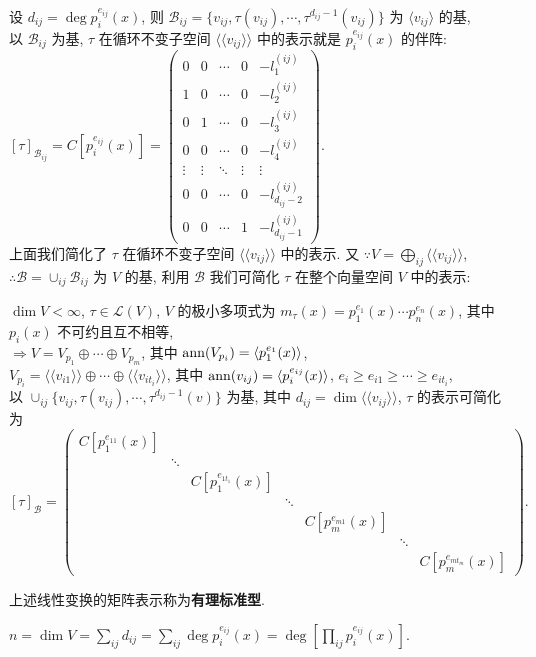 \documentclass{note}
\begin{document}
设 $d_{ij}=\deg p_i^{e_{ij}}(x)$, 则 $\mathcal{B}_{ij}=\{v_{ij},\tau(v_{ij}),\cdots,\tau^{d_{ij}-1}(v_{ij})\}$ 为 $\langle v_{ij}\rangle$ 的基,\\
以 $\mathcal{B}_{ij}$ 为基, $\tau$ 在循环不变子空间 $\langle\langle v_{ij}\rangle\rangle$ 中的表示就是 $p_i^{e_{ij}}(x)$ 的伴阵: $[\tau]_{\mathcal{B}_{ij}}=C[p_i^{e_{ij}}(x)]=\begin{pmatrix}
    0&0&\cdots&0&-l_1^{(ij)}\\
    1&0&\cdots&0&-l_2^{(ij)}\\
    0&1&\cdots&0&-l_3^{(ij)}\\
    0&0&\cdots&0&-l_4^{(ij)}\\
    \vdots&\vdots&\ddots&\vdots&\vdots\\
    0&0&\cdots&0&-l_{d_{ij}-2}^{(ij)}\\
    0&0&\cdots&1&-l_{d_{ij}-1}^{(ij)}
\end{pmatrix}$.\\

上面我们简化了 $\tau$ 在循环不变子空间 $\langle\langle v_{ij}\rangle\rangle$ 中的表示. 又 $\because V=\bigoplus_{ij}\langle\langle v_{ij}\rangle\rangle$, $\therefore\mathcal{B}=\cup_{ij}\mathcal{B}_{ij}$ 为 $V$ 的基, 利用 $\mathcal{B}$ 我们可简化 $\tau$ 在整个向量空间 $V$ 中的表示:
\begin{thm}[(课本定理 7.10)]
    $\dim V<\infty$, $\tau\in\mathcal{L}(V)$, $V$ 的极小多项式为 $m_{\tau}(x)=p_1^{e_1}(x)\cdots p_n^{e_n}(x)$, 其中 $p_i(x)$ 不可约且互不相等,\\
    $\Longrightarrow V=V_{p_1}\oplus\cdots\oplus V_{p_m}$, 其中 $\operatorname{ann}(V_{p_i})=\langle p_1^{e_1}(x)\rangle$,\\
    $V_{p_i}=\langle\langle v_{i1}\rangle\rangle\oplus\cdots\oplus\langle\langle v_{it_i}\rangle\rangle$, 其中 $\operatorname{ann}(v_{ij})=\langle p_i^{e_{ij}}(x)\rangle$, $e_i\geq e_{i1}\geq\cdots\geq e_{it_i}$,\\
    以 $\cup_{ij}\{v_{ij},\tau(v_{ij}),\cdots,\tau^{d_{ij}-1}(v)\}$ 为基, 其中 $d_{ij}=\dim\langle\langle v_{ij}\rangle\rangle$, $\tau$ 的表示可简化为
    $$[\tau]_{\mathcal{B}}=\begin{pmatrix}
        C[p_1^{e_{11}}(x)]\\
        &\ddots\\
        &&C[p_1^{e_{1t_1}}(x)]\\
        &&&\ddots\\
        &&&&C[p_m^{e_{m1}}(x)]\\
        &&&&&\ddots\\
        &&&&&&C[p_m^{e_{mt_m}}(x)]
    \end{pmatrix}.$$
\end{thm}

\begin{df}[有理标准型]
    上述线性变换的矩阵表示称为\textbf{有理标准型}.
\end{df}

$n=\dim V=\sum_{ij}d_{ij}=\sum_{ij}\deg p_i^{e_{ij}}(x)=\deg\left[\prod_{ij}p_i^{e_{ij}}(x)\right]$.
\ifx\allfiles\undefined
\end{document}
